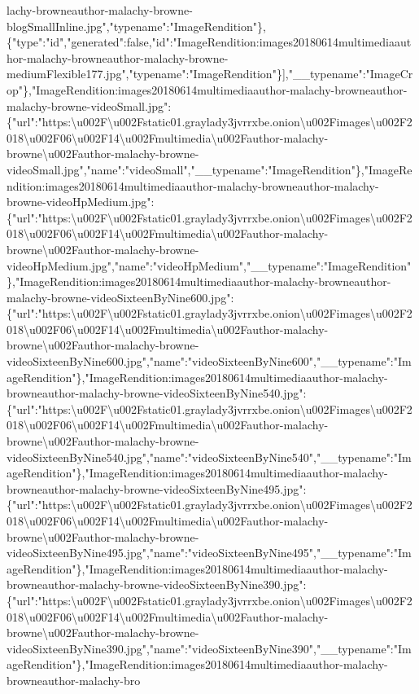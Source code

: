 lachy-browneauthor-malachy-browne-blogSmallInline.jpg","typename":"ImageRendition"\},\{"type":"id","generated":false,"id":"ImageRendition:images20180614multimediaauthor-malachy-browneauthor-malachy-browne-mediumFlexible177.jpg","typename":"ImageRendition"\}{]},"\_\_typename":"ImageCrop"\},"ImageRendition:images20180614multimediaauthor-malachy-browneauthor-malachy-browne-videoSmall.jpg":\{"url":"https:\textbackslash{}u002F\textbackslash{}u002Fstatic01.graylady3jvrrxbe.onion\textbackslash{}u002Fimages\textbackslash{}u002F2018\textbackslash{}u002F06\textbackslash{}u002F14\textbackslash{}u002Fmultimedia\textbackslash{}u002Fauthor-malachy-browne\textbackslash{}u002Fauthor-malachy-browne-videoSmall.jpg","name":"videoSmall","\_\_typename":"ImageRendition"\},"ImageRendition:images20180614multimediaauthor-malachy-browneauthor-malachy-browne-videoHpMedium.jpg":\{"url":"https:\textbackslash{}u002F\textbackslash{}u002Fstatic01.graylady3jvrrxbe.onion\textbackslash{}u002Fimages\textbackslash{}u002F2018\textbackslash{}u002F06\textbackslash{}u002F14\textbackslash{}u002Fmultimedia\textbackslash{}u002Fauthor-malachy-browne\textbackslash{}u002Fauthor-malachy-browne-videoHpMedium.jpg","name":"videoHpMedium","\_\_typename":"ImageRendition"\},"ImageRendition:images20180614multimediaauthor-malachy-browneauthor-malachy-browne-videoSixteenByNine600.jpg":\{"url":"https:\textbackslash{}u002F\textbackslash{}u002Fstatic01.graylady3jvrrxbe.onion\textbackslash{}u002Fimages\textbackslash{}u002F2018\textbackslash{}u002F06\textbackslash{}u002F14\textbackslash{}u002Fmultimedia\textbackslash{}u002Fauthor-malachy-browne\textbackslash{}u002Fauthor-malachy-browne-videoSixteenByNine600.jpg","name":"videoSixteenByNine600","\_\_typename":"ImageRendition"\},"ImageRendition:images20180614multimediaauthor-malachy-browneauthor-malachy-browne-videoSixteenByNine540.jpg":\{"url":"https:\textbackslash{}u002F\textbackslash{}u002Fstatic01.graylady3jvrrxbe.onion\textbackslash{}u002Fimages\textbackslash{}u002F2018\textbackslash{}u002F06\textbackslash{}u002F14\textbackslash{}u002Fmultimedia\textbackslash{}u002Fauthor-malachy-browne\textbackslash{}u002Fauthor-malachy-browne-videoSixteenByNine540.jpg","name":"videoSixteenByNine540","\_\_typename":"ImageRendition"\},"ImageRendition:images20180614multimediaauthor-malachy-browneauthor-malachy-browne-videoSixteenByNine495.jpg":\{"url":"https:\textbackslash{}u002F\textbackslash{}u002Fstatic01.graylady3jvrrxbe.onion\textbackslash{}u002Fimages\textbackslash{}u002F2018\textbackslash{}u002F06\textbackslash{}u002F14\textbackslash{}u002Fmultimedia\textbackslash{}u002Fauthor-malachy-browne\textbackslash{}u002Fauthor-malachy-browne-videoSixteenByNine495.jpg","name":"videoSixteenByNine495","\_\_typename":"ImageRendition"\},"ImageRendition:images20180614multimediaauthor-malachy-browneauthor-malachy-browne-videoSixteenByNine390.jpg":\{"url":"https:\textbackslash{}u002F\textbackslash{}u002Fstatic01.graylady3jvrrxbe.onion\textbackslash{}u002Fimages\textbackslash{}u002F2018\textbackslash{}u002F06\textbackslash{}u002F14\textbackslash{}u002Fmultimedia\textbackslash{}u002Fauthor-malachy-browne\textbackslash{}u002Fauthor-malachy-browne-videoSixteenByNine390.jpg","name":"videoSixteenByNine390","\_\_typename":"ImageRendition"\},"ImageRendition:images20180614multimediaauthor-malachy-browneauthor-malachy-bro